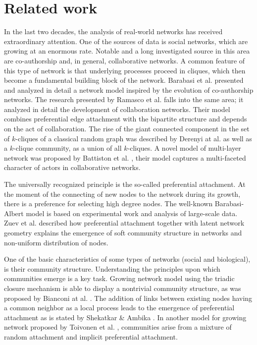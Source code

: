 \documentclass{sig-alternate-05-2015}
\begin{document}
\section{Related work}
\label{sec:rel}
 
In the last two decades, the analysis of real-world networks has received extraordinary attention. One of the sources of data is social networks, which are growing at an enormous rate. Notable and a long investigated source in this area are co-authorship and, in general, collaborative networks. A common feature of this type of network is that underlying processes proceed in cliques, which then become a fundamental building block of the network. 
Barabasi et al. \cite{ barabasi2002evolution} presented and analyzed in detail a network model inspired by the evolution of co-authorship networks. The research presented by Ramasco et al.\cite{ ramasco2004self} falls into the same area; it analyzed in detail the development of collaboration networks. Their model combines preferential edge attachment with the bipartite structure and depends on the act of collaboration. The rise of the giant connected component in the set of $k$-cliques of a classical random graph was described by Derenyi at al. \cite{derenyi2005clique} as well as a $k$-clique community, as a union of all $k$-cliques. A novel model of multi-layer network was proposed by Battiston et al. \cite{battiston2016emergence}, their model captures a multi-faceted character of actors in collaborative networks. 

The universally recognized principle is the so-called preferential attachment. At the moment of the connecting of new nodes to the network during its growth, there is a preference for selecting high degree nodes. 
The well-known Barabasi-Albert model \cite{albert2002statistical} is based on experimental work and analysis of large-scale data. 
Zuev et al. \cite{zuev2015emergence} described how preferential attachment together with latent network geometry explains the emergence of soft community structure in networks and non-uniform distribution of nodes.

One of the basic characteristics of some types of networks (social and biological), is their community structure. Understanding the principles upon which communities emerge is a key task.
Growing network model using the triadic closure mechanism is able to display a nontrivial community structure, as was proposed by Bianconi at al. \cite{bianconi2014triadic}. 
The addition of links between existing nodes having a common neighbor as a local process leads to the emergence of preferential attachment as is stated by Shekatkar \& Ambika \cite{shekatkar2015complex}.
In another model for growing network proposed by Toivonen et al. \cite{toivonen2006model}, communities arise from a mixture of random attachment and implicit preferential attachment. 
\end{document}
